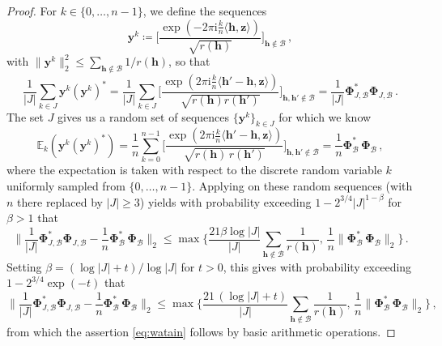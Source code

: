 \documentclass[a4paper]{amsart}
\begin{document}
\begin{proof}
    For $k\in\{0, \dots, n-1\}$, we define the sequences
    \begin{equation*}
        \bm y^k \coloneqq \Big[ \frac{\exp(-2\pi\mathrm i\frac kn \langle\bm h, \bm z\rangle)}{\sqrt{r(\bm h)}} \Big]_{\bm h\notin\mathcal B} \,,
    \end{equation*}
    with $\|\bm y^k\|_2^2 \le \sum_{\bm h\notin\mathcal B} 1/r(\bm h)$, so that
    \begin{equation*}
        \frac{1}{|J|} \sum_{k\in J} \bm y^k(\bm y^k)^\ast
        = \frac{1}{|J|} \sum_{k\in J}\Big[ \frac{\exp(2\pi\mathrm i\tfrac kn\langle\bm h'-\bm h, \bm z\rangle)}{\sqrt{r(\bm h)r(\bm h')}}\Big]_{\bm h,\bm h'\notin\mathcal B}
        = \frac{1}{|J|} \bm\Phi_{J,\mathcal B}^{\ast}\bm\Phi_{J,\mathcal B} \,.
    \end{equation*}
    The set $J$ gives us a random set of sequences $\{\bm y^k\}_{k\in J}$ for which we know
    \begin{equation*}
        \mathds E_k(\bm y^k (\bm y^k)^\ast)
        = \frac 1n \sum_{k=0}^{n-1} \Big[ \frac{\exp(2\pi\mathrm i\frac kn \langle\bm h'-\bm h, \bm z\rangle)}{\sqrt{r(\bm h) \, r(\bm h')}} \Big]_{\bm h,\bm h'\notin\mathcal B}
        = \frac 1n \bm\Phi_{\mathcal B}^\ast \, \bm\Phi_{\mathcal B} \,,
    \end{equation*}
    where the expectation is taken with respect to the discrete random variable $k$ uniformly sampled from $\{0,\dots,n-1\}$.
    Applying \cite[Proposition~3.8]{MU21} on these random sequences (with $n$ there replaced by $|J|\ge 3$) yields with probability exceeding $1-2^{3/4} |J|^{1-\beta}$ for $\beta>1$ that
    \begin{equation*}
        \Big\| \frac{1}{|J|} \bm\Phi_{J,\mathcal B}^{\ast}\bm\Phi_{J,\mathcal B} - \frac 1n \bm\Phi_{\mathcal B}^\ast \, \bm\Phi_{\mathcal B} \Big\|_{2}
        \le \max\Big\{\frac{21 \beta\log |J|}{|J|} \sum_{\bm h\notin\mathcal B} \frac{1}{r(\bm h)},\, \frac 1n \|\bm\Phi_{\mathcal B}^\ast \, \bm\Phi_{\mathcal B}\|_{2}\Big\} \,.
    \end{equation*}
    Setting $\beta = (\log |J|+t)/\log |J|$ for $t>0$, this gives with probability exceeding $1-2^{3/4}\exp(-t)$ that
    \begin{equation*}
        \Big\| \frac{1}{|J|} \bm\Phi_{J,\mathcal B}^{\ast}\bm\Phi_{J,\mathcal B} - \frac 1n \bm\Phi_{\mathcal B}^\ast \, \bm\Phi_{\mathcal B} \Big\|_{2}
        \le \max\Big\{\frac{21 \, (\log |J|+t)}{|J|} \sum_{\bm h\notin\mathcal B} \frac{1}{r(\bm h)},\, \frac 1n \|\bm\Phi_{\mathcal B}^\ast\,\bm\Phi_{\mathcal B}\|_{2}\Big\} \,,
    \end{equation*}
    from which the assertion \eqref{eq:watain} follows by basic arithmetic operations.
\end{proof} 
\end{document}
